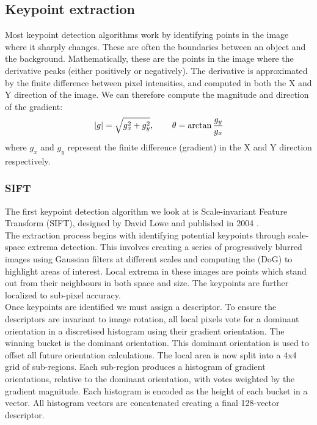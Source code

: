 \subsection{Keypoint extraction}
Most keypoint detection algorithms work by identifying points in the image where it sharply changes. These are often the boundaries between an object and the background. Mathematically, these are the points in the image where the derivative peaks (either positively or negatively). The derivative is approximated by the finite difference between pixel intensities, and computed in both the X and Y direction of the image. We can therefore compute the magnitude and direction of the gradient:
$$|g| = \sqrt{g^2_x + g^2_y}, \operatorname{\operatorname{\: \: \: \:} \operatorname{\: \: \: \:}} \theta = \arctan{\frac{g_y}{g_x}}$$
where $g_x$ and $g_y$ represent the finite difference (gradient) in the X and Y direction respectively. 

\subsubsection{SIFT}
The first keypoint detection algorithm we look at is Scale-invariant Feature Transform (SIFT), designed by David Lowe and published in 2004 \cite{SIFT}.\\

The extraction process begins with identifying potential keypoints through scale-space extrema detection. This involves creating a series of progressively blurred images using Gaussian filters at different scales and computing the  (DoG) to highlight areas of interest. Local extrema in these images are points which stand out from their neighbours in both space and size. The keypoints are further localized to sub-pixel accuracy.\\

Once keypoints are identified we must assign a descriptor. To ensure the descriptors are invariant to image rotation, all local pixels vote for a dominant orientation in a discretised histogram using their gradient orientation. The winning bucket is the dominant orientation. This dominant orientation is used to offset all future orientation calculations. The local area is now split into a 4x4 grid of sub-regions. Each sub-region produces a histogram of gradient orientations, relative to the dominant orientation, with votes weighted by the gradient magnitude. Each histogram is encoded as the height of each bucket in a vector. All histogram vectors are concatenated creating a final 128-vector descriptor.

